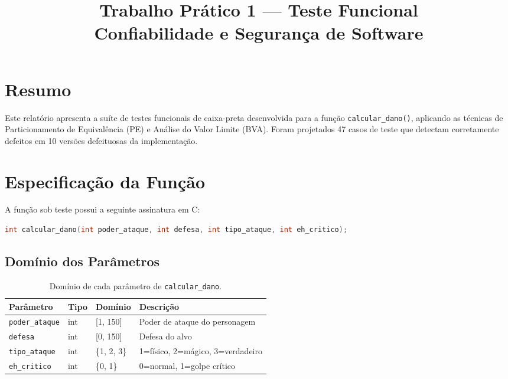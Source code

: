 \documentclass[conference, onecolumn]{IEEEtran}
\title{Trabalho Prático 1 --- Teste Funcional\\
\large Confiabilidade e Segurança de Software}
\author{
    \IEEEauthorblockN{Bruno Becker Silva}
    \IEEEauthorblockA{Escola Politécnica, PUCRS \\ \texttt{bruno.becker@edu.pucrs.br}}
}
\begin{document}
\maketitle

\section*{Resumo}

Este relatório apresenta a suíte de testes funcionais de caixa-preta desenvolvida para a
função \texttt{calcular\_dano()}, aplicando as técnicas de Particionamento de Equivalência
(PE) e Análise do Valor Limite (BVA). Foram projetados 47 casos de teste que detectam
corretamente defeitos em 10 versões defeituosas da implementação.

\section{Especificação da Função}

A função sob teste possui a seguinte assinatura em C:

\begin{lstlisting}[language=C, numbers=none]
int calcular_dano(int poder_ataque, int defesa, int tipo_ataque, int eh_critico);
\end{lstlisting}

\subsection{Domínio dos Parâmetros}

\begin{table}[H]
\centering
\caption{Domínio de cada parâmetro de \texttt{calcular\_dano}.}
\begin{tabular}{@{}llll@{}}
\toprule
\textbf{Parâmetro} & \textbf{Tipo} & \textbf{Domínio} & \textbf{Descrição} \\
\midrule
\texttt{poder\_ataque} & int & {[}1, 150{]} & Poder de ataque do personagem \\
\texttt{defesa}        & int & {[}0, 150{]} & Defesa do alvo \\
\texttt{tipo\_ataque}  & int & \{1, 2, 3\}  & 1=físico, 2=mágico, 3=verdadeiro \\
\texttt{eh\_critico}   & int & \{0, 1\}     & 0=normal, 1=golpe crítico \\
\bottomrule
\end{tabular}
\end{table}
\end{document}
